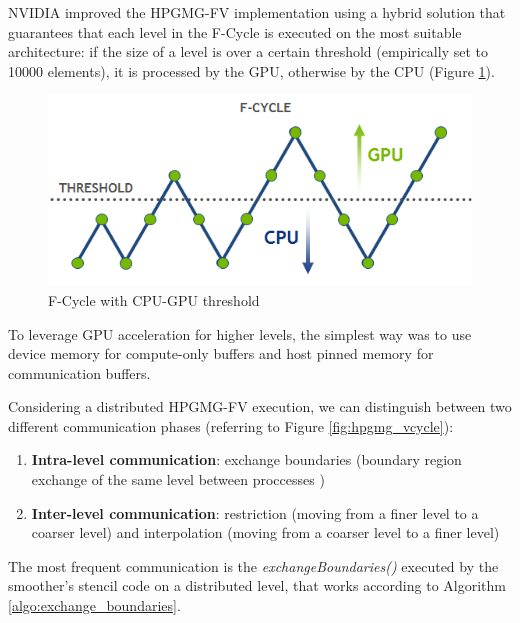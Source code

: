 \documentclass[review]{siamart1116}
\begin{document}
NVIDIA improved the HPGMG-FV implementation \cite{HPGMG_NVIDIA} using
a hybrid solution that guarantees that each level in the F-Cycle is
executed on the most suitable architecture: if the size of a level is over a certain threshold (empirically set to 10000 elements), it is processed by the GPU, otherwise by the CPU (Figure \ref{fig:hpgmg_fcycle}).

\begin{figure}[h]
\centering
\includegraphics[scale=0.6]{hpgmg_f_cycle.png}
\caption{F-Cycle with CPU-GPU threshold}
\label{fig:hpgmg_fcycle}
\end{figure}

To leverage GPU acceleration for higher levels, the simplest way was to use device memory for compute-only buffers and host pinned memory for communication buffers.

Considering a distributed HPGMG-FV execution, we can distinguish between two different communication phases (referring to Figure \ref{fig:hpgmg_vcycle}):
\begin{enumerate}
\item \textbf{Intra-level communication}: exchange boundaries (boundary region exchange of the same level between proccesses )
\item \textbf{Inter-level communication}: restriction (moving from a finer level to a coarser level) and interpolation (moving from a coarser level to a finer level)
\end{enumerate}

The most frequent communication is the \emph{exchangeBoundaries()} executed by the smoother's
stencil code on a distributed level, that works according to Algorithm
\ref{algo:exchange_boundaries}.
\end{document}
